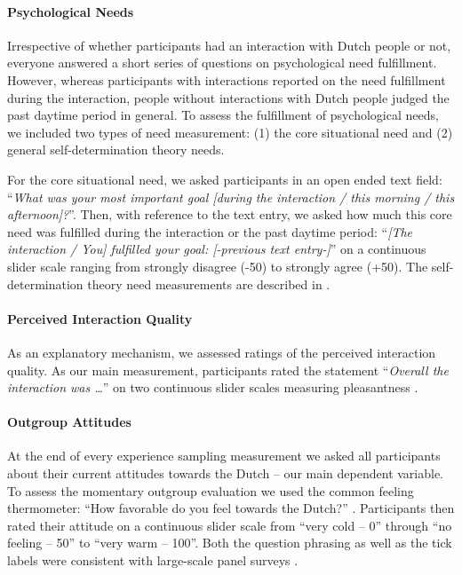 \paragraph{Psychological Needs}

Irrespective of whether participants had an interaction with Dutch
people or not, everyone answered a short series of questions on
psychological need fulfillment. However, whereas participants with
interactions reported on the need fulfillment during the interaction,
people without interactions with Dutch people judged the past daytime
period in general. To assess the fulfillment of psychological needs, we
included two types of need measurement: (1) the core situational need
and (2) general self-determination theory needs.

For the core situational need, we asked participants in an open ended
text field:
``\textit{What was your most important goal [during the interaction / this morning / this afternoon]?}''.
Then, with reference to the text entry, we asked how much this core need
was fulfilled during the interaction or the past daytime period:
``\textit{[The interaction / You] fulfilled your goal: [-previous text entry-]}''
on a continuous slider scale ranging from strongly disagree (-50) to
strongly agree (+50). The self-determination theory need measurements
are described in .

\paragraph{Perceived Interaction Quality}

As an explanatory mechanism, we assessed ratings of the perceived
interaction quality. As our main measurement, participants rated the
statement ``\textit{Overall the interaction was …}'' on two continuous
slider scales measuring pleasantness
\citep[from unpleasant (-50) to pleasant (+50)) and meaningfulness (from superficial (-50) to meaningful (+50); both items adapted from][]{Downie2008}.

\paragraph{Outgroup Attitudes}

At the end of every experience sampling measurement we asked all
participants about their current attitudes towards the Dutch -- our main
dependent variable. To assess the momentary outgroup evaluation we used
the common feeling thermometer: ``How favorable do you feel towards the
Dutch?'' \citep[][]{Lavrakas2008}. Participants then rated their
attitude on a continuous slider scale from ``very cold -- 0'' through
``no feeling -- 50'' to ``very warm -- 100''. Both the question phrasing
as well as the tick labels were consistent with large-scale panel
surveys \citep[e.g.,][]{DeBell2010}.

